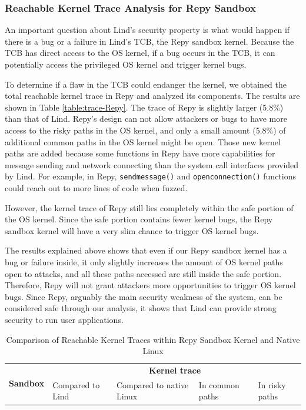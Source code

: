 {{\subsubsection{Reachable Kernel Trace Analysis for Repy Sandbox} 
\label{Reachable-Kernel-Trace-Analysis-for-Repy-Sandbox}

An important question about Lind's security property is what would happen if
there is a bug or a failure in Lind's TCB,
the Repy sandbox kernel. Because the TCB has direct access to the OS
kernel, if a bug occurs in the TCB,
it can potentially access the privileged OS kernel and trigger kernel bugs.

To determine if a flaw in the TCB could endanger the kernel,
we obtained the total reachable kernel trace in Repy and analyzed its
components.
The results are shown in Table \ref{table:trace-Repy}. The trace of Repy is
slightly larger (5.8\%) than that of Lind.
Repy's design can not allow attackers or bugs to
have more access to the risky paths in the OS kernel, and only a small amount (5.8\%) of
additional common paths in the OS kernel might be open. 
Those new kernel paths are added because some functions in Repy
have more capabilities for message sending and network connecting than the system call interfaces
provided by Lind. For example, in Repy,
\texttt{sendmessage()} and \texttt{openconnection()}
functions could reach out to more lines of code when fuzzed.

However, the kernel trace of Repy still lies completely within the safe
portion of the OS kernel.
Since the safe portion contains fewer kernel bugs, the Repy sandbox kernel
will have a very slim chance to trigger OS kernel bugs.

The results explained above shows that even if our Repy sandbox kernel has a
bug or failure inside,
it only slightly increases the amount of OS kernel paths open to attacks,
and all these paths accessed are still inside the safe portion.
Therefore, Repy will not grant attackers more opportunities to trigger OS
kernel bugs.
Since Repy, arguably the main security weakness of the system, can be
considered safe through our analysis,
it shows that Lind can provide strong security to run user applications.

\begin{table}
\centering
\scriptsize
\caption{Comparison of Reachable Kernel Traces within Repy Sandbox Kernel and Native Linux}
\begin{tabular}{|l|l|l|l|l|}
  \hline
  \multirow{3}{.8cm}{\bf Sandbox} & \multicolumn{4}{c|}{\bf Kernel trace} \\ \cline{2-5}
  & \multirow{2}{1cm}{Compared to Lind} &
  \multirow{2}{1.3cm}{Compared to native Linux} & \multirow{2}{1.5cm}{In common paths} & 
  \multirow{2}{1.0cm}{In risky paths} \\
  & & & & \\  \hline


\end{tabular}
\end{table}}}
